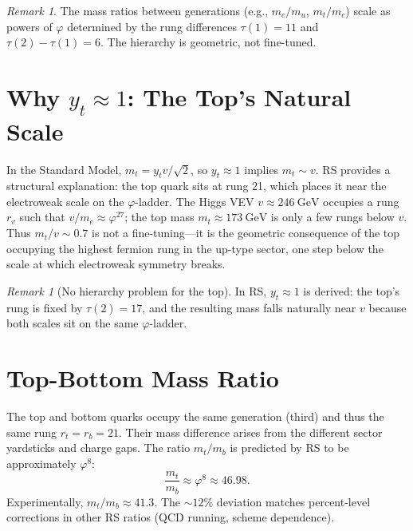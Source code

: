 \documentclass[12pt,a4paper]{article}
\theoremstyle{definition}
\theoremstyle{remark}
\newtheorem{remark}[theorem]{Remark}
\begin{document}
\begin{remark}
The mass ratios between generations (e.g., $m_c/m_u$, $m_t/m_c$)
scale as powers of $\varphi$ determined by the rung differences
$\tau(1) = 11$ and $\tau(2) - \tau(1) = 6$.  The hierarchy is
geometric, not fine-tuned.
\end{remark}

\section{Why $y_t \approx 1$: The Top's Natural Scale}
\label{sec:yt}

In the Standard Model, $m_t = y_t v/\sqrt{2}$, so $y_t \approx 1$
implies $m_t \sim v$.  RS provides a structural explanation: the top
quark sits at rung 21, which places it near the electroweak scale on
the $\varphi$-ladder.  The Higgs VEV $v \approx 246~\mathrm{GeV}$
occupies a rung $r_v$ such that $v/m_e \approx \varphi^{27}$; the top
mass $m_t \approx 173~\mathrm{GeV}$ is only a few rungs below $v$.
Thus $m_t/v \sim 0.7$ is not a fine-tuning---it is the geometric
consequence of the top occupying the highest fermion rung in the
up-type sector, one step below the scale at which electroweak
symmetry breaks.

\begin{remark}[No hierarchy problem for the top]
In RS, $y_t \approx 1$ is derived: the top's rung is fixed by
$\tau(2) = 17$, and the resulting mass falls naturally near $v$
because both scales sit on the same $\varphi$-ladder.
\end{remark}

\section{Top-Bottom Mass Ratio}
\label{sec:tb}

The top and bottom quarks occupy the same generation (third) and thus
the same rung $r_t = r_b = 21$.  Their mass difference arises from
the different sector yardsticks and charge gaps.  The ratio
$m_t/m_b$ is predicted by RS to be approximately $\varphi^8$:
\begin{equation}
  \frac{m_t}{m_b} \approx \varphi^8 \approx 46.98.
\end{equation}
Experimentally, $m_t/m_b \approx 41.3$.  The $\sim 12\%$ deviation
matches percent-level corrections in other RS ratios (QCD running,
scheme dependence).
\end{document}
